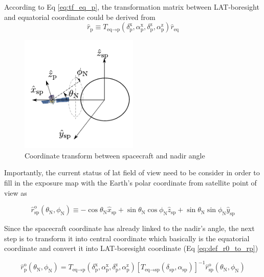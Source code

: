 According to Eq \ref{eq:tf_eq_p}, the transformation matrix between LAT-boresight and equatorial coordinate could be derived from
\begin{equation}
    \hat{r}_\text{p} \equiv T_{\text{eq}\rightarrow\text{p}} (\delta^\text{x}_\text{p}, \alpha^\text{x}_\text{p}, \delta^\text{z}_\text{p}, \alpha^\text{z}_\text{p}) \hat{r}_\text{eq}
\end{equation}

\begin{figure}[h!]
    \centering
    \includegraphics[width=0.5\textwidth]{img/fig_coordinate/coord_eq_p.pdf}
    \caption{Coordinate transform between spacecraft and nadir angle}
\end{figure}

Importantly, the current status of lat field of view need to be consider in order to fill in the exposure map with the Earth’s polar coordinate from satellite point of view as 

\begin{equation}
    \hat{r}^\text{o}_\text{sp} (\theta_\text{N}, \phi_\text{N}) \equiv -\cos\theta_\text{N}\hat{x}_\text{sp} + \sin\theta_\text{N}\cos\phi_\text{N}\hat{z}_\text{sp} + \sin\theta_\text{N}\sin\phi_\text{N}\hat{y}_\text{sp}
    \label{eq:def_r0}
\end{equation}

Since the spacecraft coordinate has already linked to the nadir's angle, the next step is to transform it into central coordinate which basically is the equatorial coordinate and convert it into LAT-boresight coordinate (Eq \ref{eq:def_r0_to_rp})

\begin{equation}
    \hat{r}^\text{o}_\text{p} (\theta_\text{N}, \phi_\text{N}) = T_{\text{eq}\rightarrow\text{p}} (\delta^\text{x}_\text{p}, \alpha^\text{x}_\text{p}, \delta^\text{z}_\text{p}, \alpha^\text{z}_\text{p}) \left[T_{\text{eq}\rightarrow\text{sp}} (\delta_\text{sp}, \alpha_\text{sp})\right]^{-1} \hat{r}^\text{o}_\text{sp} (\theta_\text{N}, \phi_\text{N})
    \label{eq:def_r0_to_rp}
\end{equation}

